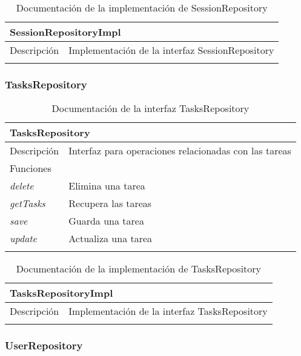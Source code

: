 \begin{longtable}{|p{} p{}|}
    \hline
    \multicolumn{2}{|l|}{\textbf{SessionRepositoryImpl}} \\ \hline \hline
    Descripción      & Implementación de la interfaz SessionRepository \\ \hline
    \caption{Documentación de la implementación de SessionRepository}
    \label{dis:app:session_repository_impl}
\end{longtable}

\newpage
\subsubsection{TasksRepository}

\begin{longtable}{|p{} p{}|}
    \hline
    \multicolumn{2}{|l|}{\textbf{TasksRepository}} \\ \hline \hline
    Descripción      & Interfaz para operaciones relacionadas con las tareas \\ \hline
    \multicolumn{2}{|l|}{Funciones} \\
    \emph{delete}  & Elimina una tarea \\
    \emph{getTasks}  & Recupera las tareas \\
    \emph{save}  & Guarda una tarea \\
    \emph{update}  & Actualiza una tarea \\ \hline
    \caption{Documentación de la interfaz TasksRepository}
    \label{dis:app:tasks_repository}
\end{longtable}

\begin{longtable}{|p{} p{}|}
    \hline
    \multicolumn{2}{|l|}{\textbf{TasksRepositoryImpl}} \\ \hline \hline
    Descripción      & Implementación de la interfaz TasksRepository \\ \hline
    \caption{Documentación de la implementación de TasksRepository}
    \label{dis:app:tasks_repository_impl}
\end{longtable}

\subsubsection{\textbf{UserRepository}}

